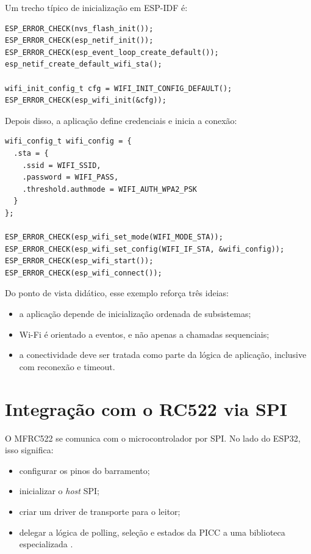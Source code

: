 Um trecho típico de inicialização em ESP-IDF é:
\begin{verbatim}
ESP_ERROR_CHECK(nvs_flash_init());
ESP_ERROR_CHECK(esp_netif_init());
ESP_ERROR_CHECK(esp_event_loop_create_default());
esp_netif_create_default_wifi_sta();

wifi_init_config_t cfg = WIFI_INIT_CONFIG_DEFAULT();
ESP_ERROR_CHECK(esp_wifi_init(&cfg));
\end{verbatim}

Depois disso, a aplicação define credenciais e inicia a conexão:
\begin{verbatim}
wifi_config_t wifi_config = {
  .sta = {
    .ssid = WIFI_SSID,
    .password = WIFI_PASS,
    .threshold.authmode = WIFI_AUTH_WPA2_PSK
  }
};

ESP_ERROR_CHECK(esp_wifi_set_mode(WIFI_MODE_STA));
ESP_ERROR_CHECK(esp_wifi_set_config(WIFI_IF_STA, &wifi_config));
ESP_ERROR_CHECK(esp_wifi_start());
ESP_ERROR_CHECK(esp_wifi_connect());
\end{verbatim}

Do ponto de vista didático, esse exemplo reforça três ideias:
\begin{itemize}[leftmargin=*]
  \item a aplicação depende de inicialização ordenada de subsistemas;
  \item Wi-Fi é orientado a eventos, e não apenas a chamadas sequenciais;
  \item a conectividade deve ser tratada como parte da lógica de aplicação, inclusive com reconexão e timeout.
\end{itemize}

\section{Integração com o RC522 via SPI}
O MFRC522 se comunica com o microcontrolador por SPI. No lado do ESP32, isso significa:
\begin{itemize}[leftmargin=*]
  \item configurar os pinos do barramento;
  \item inicializar o \textit{host} SPI;
  \item criar um driver de transporte para o leitor;
  \item delegar a lógica de polling, seleção e estados da PICC a uma biblioteca especializada \citep{nxp_mfrc522,espidf_spi_master}.
\end{itemize}


